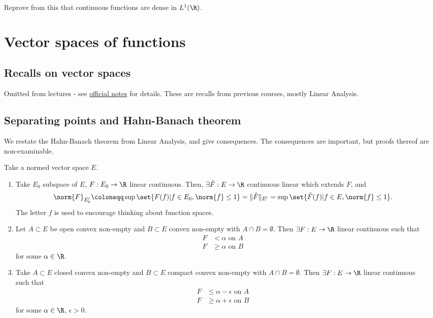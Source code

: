 \documentclass[twoside]{article}
\begin{document}
\begin{ex}
    Reprove from this that continuous functions are dense in $L^1(\R)$.
\end{ex}

\clearpage
\section{Vector spaces of functions}
\subsection{Recalls on vector spaces}
Omitted from lectures - see \href{https://cmouhot.files.wordpress.com/2017/01/chap2-v13.pdf}{official notes} for details. These are recalls from previous courses, mostly Linear Analysis.
\subsection{Separating points and Hahn-Banach theorem}
We restate the Hahn-Banach theorem from Linear Analysis, and give consequences. The consequences are important, but proofs thereof are non-examinable.
\begin{thm}\label{thm:hb}
    Take a normed vector space $E$.
    \begin{enumerate}[label=(\roman*)]
        \item Take $E_0$ subspace of $E$, $F:E_0 \to \R$ linear continuous. Then, $\exists \tilde{F}:E \to \R$ continuous linear which extends $F$, and
            \begin{equation*}
                \norm{F}_{E_0'} \coloneqq \sup\set{F(f) | f \in E_0, \norm{f} \leq 1} = \lVert\tilde{F}\rVert _{E'}= \sup\set{\tilde{F}(f)| f \in E, \norm{f} \leq 1}.
            \end{equation*}
            The letter $f$ is used to encourage thinking about function spaces.
        \item Let $A \subset E$ be open convex non-empty and $B \subset E$ convex non-empty with $A \cap B = \emptyset$.
            Then $\exists F: E \to \R$ linear continuous such that
            \begin{align*}
                F &< \alpha \text{ on } A \\
                F &\geq \alpha \text{ on } B
            \end{align*}
            for some $\alpha \in \R$.
        \item Take $A \subset E$ closed convex non-empty and $B \subset E$ compact convex non-empty with $A\cap B= \emptyset$.
            Then $\exists F: E \to \R$ linear continuous such that
            \begin{align*}
                F &\leq \alpha - \epsilon\text{ on }A \\
                F &\geq \alpha + \epsilon\text{ on }B
            \end{align*}
            for some $\alpha \in \R$, $\epsilon> 0$.
    \end{enumerate}
\end{thm}
\end{document}
